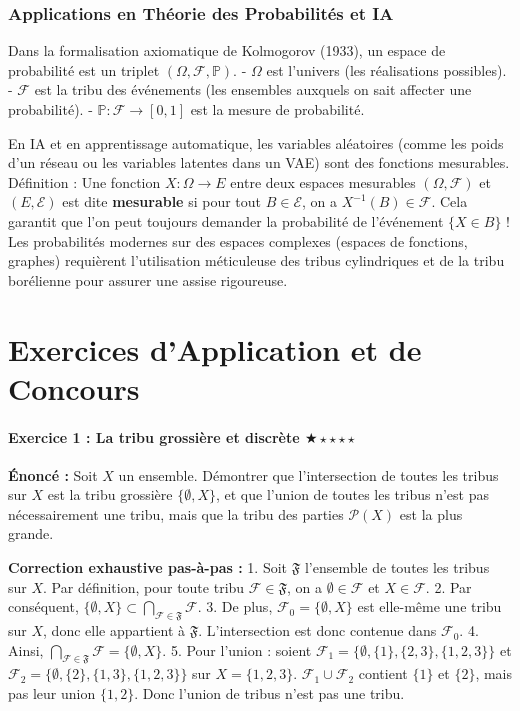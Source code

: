 \documentclass[11pt,a4paper]{article}
\begin{document}
\section{Applications en Théorie des Probabilités et IA}

Dans la formalisation axiomatique de Kolmogorov (1933), un espace de probabilité est un triplet $(\Omega, \mathcal{F}, \mathbb{P})$.
- $\Omega$ est l'univers (les réalisations possibles).
- $\mathcal{F}$ est la tribu des événements (les ensembles auxquels on sait affecter une probabilité).
- $\mathbb{P} : \mathcal{F} \to [0, 1]$ est la mesure de probabilité.

En IA et en apprentissage automatique, les variables aléatoires (comme les poids d'un réseau ou les variables latentes dans un VAE) sont des fonctions mesurables.
Définition : Une fonction $X : \Omega \to E$ entre deux espaces mesurables $(\Omega, \mathcal{F})$ et $(E, \mathcal{E})$ est dite \textbf{mesurable} si pour tout $B \in \mathcal{E}$, on a $X^{-1}(B) \in \mathcal{F}$.
Cela garantit que l'on peut toujours demander la probabilité de l'événement $\{ X \in B \}$ !
Les probabilités modernes sur des espaces complexes (espaces de fonctions, graphes) requièrent l'utilisation méticuleuse des tribus cylindriques et de la tribu borélienne pour assurer une assise rigoureuse.


\part{Exercices d'Application et de Concours}
\subsection*{Exercice 1 : La tribu grossière et discrète \quad $\bigstar\star\star\star\star$}


\textbf{Énoncé :}
Soit $X$ un ensemble. Démontrer que l'intersection de toutes les tribus sur $X$ est la tribu grossière $\{\emptyset, X\}$, et que l'union de toutes les tribus n'est pas nécessairement une tribu, mais que la tribu des parties $\mathcal{P}(X)$ est la plus grande.

\textbf{Correction exhaustive pas-à-pas :}
1. Soit $\mathfrak{F}$ l'ensemble de toutes les tribus sur $X$. Par définition, pour toute tribu $\mathcal{F} \in \mathfrak{F}$, on a $\emptyset \in \mathcal{F}$ et $X \in \mathcal{F}$.
2. Par conséquent, $\{\emptyset, X\} \subset \bigcap_{\mathcal{F} \in \mathfrak{F}} \mathcal{F}$.
3. De plus, $\mathcal{F}_0 = \{\emptyset, X\}$ est elle-même une tribu sur $X$, donc elle appartient à $\mathfrak{F}$. L'intersection est donc contenue dans $\mathcal{F}_0$.
4. Ainsi, $\bigcap_{\mathcal{F} \in \mathfrak{F}} \mathcal{F} = \{\emptyset, X\}$.
5. Pour l'union : soient $\mathcal{F}_1 = \{\emptyset, \{1\}, \{2, 3\}, \{1, 2, 3\}\}$ et $\mathcal{F}_2 = \{\emptyset, \{2\}, \{1, 3\}, \{1, 2, 3\}\}$ sur $X=\{1, 2, 3\}$. $\mathcal{F}_1 \cup \mathcal{F}_2$ contient $\{1\}$ et $\{2\}$, mais pas leur union $\{1, 2\}$. Donc l'union de tribus n'est pas une tribu.
\end{document}
